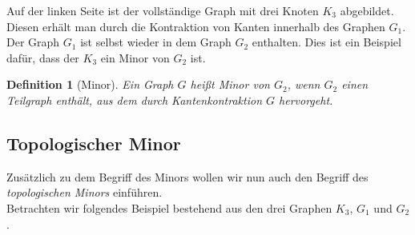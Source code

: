 \documentclass[a4paper]{article}
\newtheorem{definition}{Definition}
\begin{document}
Auf der linken Seite ist der vollständige Graph mit drei Knoten $K_3$ abgebildet. 
Diesen erhält man durch die Kontraktion von Kanten innerhalb des Graphen $G_1$. 
Der Graph $G_1$ ist selbst wieder in dem Graph $G_2$ enthalten.
Dies ist ein Beispiel dafür, dass der $K_3$ ein Minor von $G_2$ ist.

\begin{definition}[Minor]
Ein Graph $G$ heißt \textit{Minor} von $G_2$, wenn $G_2$ einen Teilgraph enthält, aus dem durch Kantenkontraktion $G$ hervorgeht.
\end{definition}


\subsection{Topologischer Minor}
Zusätzlich zu dem Begriff des Minors wollen wir nun auch den Begriff des \textit{topologischen Minors} einführen.\\

Betrachten wir folgendes Beispiel bestehend aus den drei Graphen $K_3$, $G_1$ und $G_2$.
\end{document}
